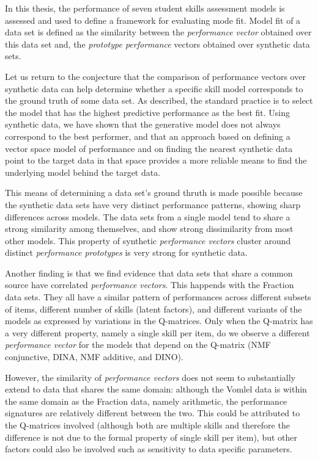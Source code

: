 \label{sec:Conclusion}

In this thesis, the performance of seven student skills assessment models is assessed and used to define a framework for evaluating mode fit.  Model fit of a data set is defined as the similarity between the \textit{performance vector} obtained over this data set and, the \textit{prototype performance} vectors obtained over synthetic data sets.

Let us return to the conjecture that the comparison of performance vectors over synthetic data can help determine whether a specific skill model corresponds to the ground truth of some data set. As described, the standard practice is to select the model that has the highest predictive performance as the best fit.  Using synthetic data, we have shown that the generative model does not always correspond to the best performer, and that an approach based on defining a vector space model of performance and on finding the nearest synthetic data point to the target data in that space provides a more reliable means to find the underlying model behind the target data.

This means of determining a data set's ground thruth is made possible because the synthetic data sets have very distinct performance patterns, showing sharp differences across models.  The data sets from a single model tend to share a strong similarity among themselves, and show strong dissimilarity from most other models.  This property of synthetic \textit{performance vectors} cluster around distinct \textit{performance prototypes} is very strong for synthetic data.

Another finding is that we find evidence that data sets that share a common source have correlated \textit{performance vectors}.  This happends with the Fraction data sets.  They all have a similar pattern of performances across different subsets of items, different number of skills (latent factors), and different variants of the models as expressed by variations in the Q-matrices. Only when the Q-matrix has a very different property, namely a single skill per item, do we observe a different \textit{performance vector} for the models that depend on the Q-matrix (NMF conjunctive, DINA, NMF additive, and DINO).  

However, the similarity of \textit{performance vectors} does not seem to substantially extend to data that shares the same domain: although the Vomlel data is within the same domain as the Fraction data, namely arithmetic, the performance signatures are relatively different between the two.  This could be attributed to the Q-matrices involved (although both are multiple skills and therefore the difference is not due to the formal property of single skill per item), but other factors could also be involved such as sensitivity to data specific parameters.

